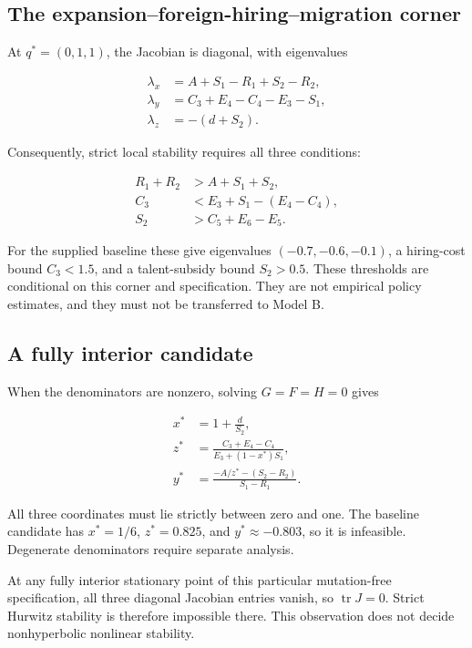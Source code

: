 \documentclass[
  11pt,
  letterpaper,
]{article}
\begin{document}
\subsection{The expansion--foreign-hiring--migration
corner}\label{the-expansionforeign-hiringmigration-corner}

At \(q^*=(0,1,1)\), the Jacobian is diagonal, with eigenvalues

\[
\begin{aligned}
\lambda_x&=A+S_1-R_1+S_2-R_2,\\
\lambda_y&=C_3+E_4-C_4-E_3-S_1,\\
\lambda_z&=-(d+S_2).
\end{aligned}
\]

Consequently, strict local stability requires all three conditions:

\[
\begin{aligned}
R_1+R_2&>A+S_1+S_2,\\
C_3&<E_3+S_1-(E_4-C_4),\\
S_2&>C_5+E_6-E_5.
\end{aligned}
\]

For the supplied baseline these give eigenvalues \((-0.7,-0.6,-0.1)\), a
hiring-cost bound \(C_3<1.5\), and a talent-subsidy bound \(S_2>0.5\).
These thresholds are conditional on this corner and specification. They
are not empirical policy estimates, and they must not be transferred to
Model B.

\subsection{A fully interior
candidate}\label{a-fully-interior-candidate}

When the denominators are nonzero, solving \(G=F=H=0\) gives

\[
\begin{aligned}
x^*&=1+\frac{d}{S_2},\\
z^*&=\frac{C_3+E_4-C_4}{E_3+(1-x^*)S_1},\\
y^*&=\frac{-A/z^*-(S_2-R_2)}{S_1-R_1}.
\end{aligned}
\]

All three coordinates must lie strictly between zero and one. The
baseline candidate has \(x^*=1/6\), \(z^*=0.825\), and
\(y^*\approx-0.803\), so it is infeasible. Degenerate denominators
require separate analysis.

At any fully interior stationary point of this particular mutation-free
specification, all three diagonal Jacobian entries vanish, so
\(\operatorname{tr}J=0\). Strict Hurwitz stability is therefore
impossible there. This observation does not decide nonhyperbolic
nonlinear stability.
\end{document}
